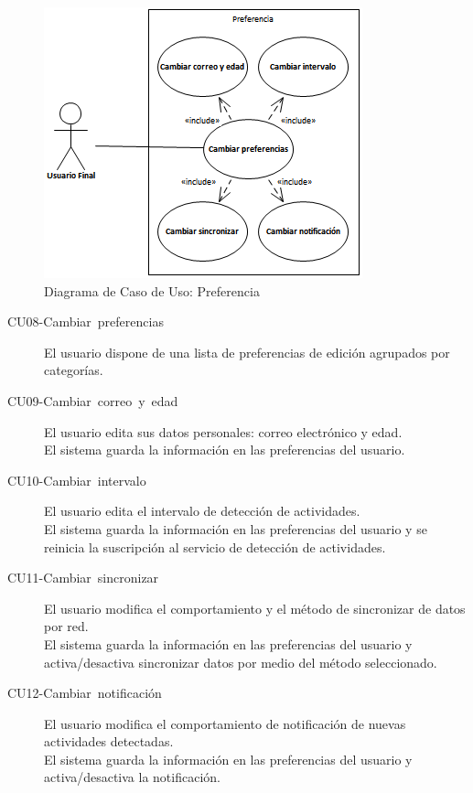 \begin{figure}[H]
\begin{centering}
\includegraphics{capitulo-5/graphics/caso_preferencia}
\par\end{centering}
\caption[Diagrama de Caso de Uso: Preferencia]{\label{fig5:uc-preferencia}Diagrama de Caso de Uso: Preferencia}
\end{figure}

\begin{description}
\item [{CU08-Cambiar~preferencias}] El usuario dispone de una lista de
preferencias de edición agrupados por categorías. 
\item [{CU09-Cambiar~correo~y~edad}] El usuario edita sus datos personales:
correo electrónico y edad. \\
El sistema guarda la información en las preferencias del usuario.
\item [{CU10-Cambiar~intervalo}] El usuario edita el intervalo de detección
de actividades. \\
El sistema guarda la información en las preferencias del usuario y
se reinicia la suscripción al servicio de detección de actividades.
\item [{CU11-Cambiar~sincronizar}] El usuario modifica el comportamiento
y el método de sincronizar de datos por red. \\
El sistema guarda la información en las preferencias del usuario y
activa/desactiva sincronizar datos por medio del método seleccionado.
\item [{CU12-Cambiar~notificación}] El usuario modifica el comportamiento
de notificación de nuevas actividades detectadas. \\
El sistema guarda la información en las preferencias del usuario y
activa/desactiva la notificación.
\end{description}

